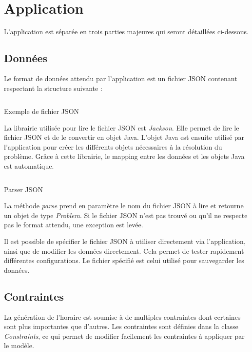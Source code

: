 \section{Application}

L'application est séparée en trois parties majeures qui seront détaillées ci-dessous.

\subsection{Données}
Le format de données attendu par l'application est un fichier JSON contenant respectant la structure suivante :

\begin{listing}[H]
    \inputminted{json}{assets/figures/example.json}
    \caption{Exemple de fichier JSON}
\end{listing}


La librairie utilisée pour lire le fichier JSON est \textit{Jackson}. Elle permet de lire le fichier JSON et de le convertir en objet Java. L'objet Java est ensuite utilisé par l'application pour créer les différents objets nécessaires à la résolution du problème. Grâce à cette librairie, le mapping entre les données et les objets Java est automatique.

\begin{listing}[H]
    \inputminted{java}{assets/figures/parser.java}
    \caption{Parser JSON}
\end{listing}

La méthode \textit{parse} prend en paramètre le nom du fichier JSON à lire et retourne un objet de type \textit{Problem}. Si le fichier JSON n'est pas trouvé ou qu'il ne respecte pas le format attendu, une exception est levée.

Il est possible de spécifier le fichier JSON à utiliser directement via l'application, ainsi que de modifier les données directement. Cela permet de tester rapidement différentes configurations. Le fichier spécifié est celui utilisé pour sauvegarder les données.

\subsection{Contraintes}

La génération de l'horaire est soumise à de multiples contraintes dont certaines sont plus importantes que d'autres. Les contraintes sont définies dans la classe \textit{Constraints}, ce qui permet de modifier facilement les contraintes à appliquer par le modèle.


